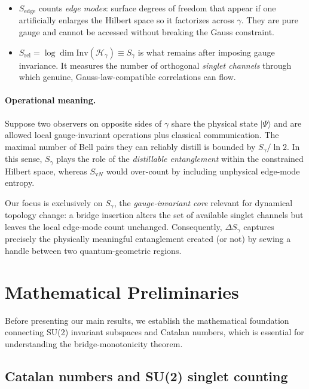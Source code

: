 \documentclass[11pt, a4paper]{article}
\theoremstyle{plain}
\theoremstyle{definition}
\theoremstyle{remark}
\newcommand{\Hil}{\mathcal{H}}
\newcommand{\Inv}{\mathrm{Inv}}
\begin{document}
\begin{itemize}\setlength\itemsep{4pt}
  \item
    $S_{\text{edge}}$ counts \emph{edge modes}: surface degrees of freedom that appear if one artificially enlarges the Hilbert space so it factorizes across $\gamma$. They are pure gauge and cannot be accessed without breaking the Gauss constraint.
  \item
    $S_{\text{rel}}=\log\dim\Inv(\Hil_{\gamma})\equiv S_{\gamma}$
    is what remains after imposing gauge invariance. It measures the number of orthogonal \emph{singlet channels} through which genuine, Gauss-law-compatible correlations can flow.
\end{itemize}

\paragraph{Operational meaning.}
Suppose two observers on opposite sides of $\gamma$ share the physical state $|\Psi\rangle$ and are allowed local gauge-invariant operations plus classical communication. The maximal number of Bell pairs they can reliably distill is bounded by $S_{\gamma}/\ln2$. In this sense, $S_{\gamma}$ plays the role of the \emph{distillable entanglement} within the constrained Hilbert space, whereas $S_{\mathrm vN}$ would over-count by including unphysical edge-mode entropy.

Our focus is exclusively on $S_{\gamma}$, the \emph{gauge-invariant core} relevant for dynamical topology change: a bridge insertion alters the set of available singlet channels but leaves the local edge-mode count unchanged. Consequently, $\Delta S_{\gamma}$ captures precisely the physically meaningful entanglement created (or not) by sewing a handle between two quantum-geometric regions.

\section{Mathematical Preliminaries}
\label{sec:math_prelim}

Before presenting our main results, we establish the mathematical foundation connecting SU(2) invariant subspaces and Catalan numbers, which is essential for understanding the bridge-monotonicity theorem.

\subsection{Catalan numbers and SU(2) singlet counting}
\label{sec:catalan}
\end{document}
